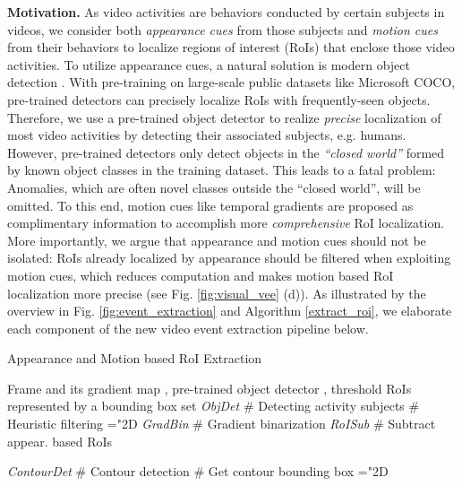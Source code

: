 \documentclass[sigconf]{acmart}
\begin{document}
\textbf{Motivation.} As video activities are behaviors conducted by certain subjects in videos, we consider both \textit{appearance cues} from those subjects and \textit{motion cues} from their behaviors to localize regions of interest (RoIs) that enclose those video activities. To utilize appearance cues, a natural solution is modern object detection \cite{cai2018cascade}. With pre-training on large-scale public datasets like Microsoft COCO, pre-trained detectors can precisely localize RoIs with frequently-seen objects. Therefore, we use a pre-trained object detector to realize \textit{precise} localization of most video activities by detecting their associated subjects, e.g. humans. However, pre-trained detectors only detect objects in the \textit{``closed world''} formed by known object classes in the training dataset. This leads to a fatal problem: Anomalies, which are often novel classes outside the ``closed world'', will be omitted. To this end, motion cues like temporal gradients are proposed as complimentary information to accomplish more \textit{comprehensive} RoI localization. More importantly, we argue that appearance and motion cues should not be isolated: RoIs already localized by appearance should be filtered when exploiting motion cues, which reduces computation and makes motion based RoI localization more precise (see Fig. \ref{fig:visual_vee} (d)). As illustrated by the overview in Fig. \ref{fig:event_extraction} and Algorithm \ref{extract_roi}, we elaborate each component of the new video event extraction pipeline below.

\begin{algorithm}[t]
	\caption{Appearance and Motion based RoI Extraction}
	\label{extract_roi}
	\begin{algorithmic}[1] \REQUIRE Frame  and its gradient map , pre-trained object detector , threshold 
		\ENSURE RoIs represented by a bounding box set 
		\STATE  \textit{ObjDet} \quad \# Detecting activity subjects
		\STATE  \quad \# Heuristic filtering
		\FOR {}
		\mathchardef\mhyphen="2D
		\IF { \AND }
		\STATE 
		\ENDIF
		\ENDFOR
		\STATE  \textit{GradBin} \quad \# Gradient binarization
		\STATE  \textit{RoISub} \quad \# Subtract appear. based RoIs
		
		\STATE  \textit{ContourDet} \quad \# Contour detection
		\STATE 
		\FOR {}
		\STATE  \quad \# Get contour bounding box
		\mathchardef\mhyphen="2D
		\IF { \AND }
		\STATE 
		\ENDIF
		\ENDFOR
\STATE 
	\end{algorithmic}
\end{algorithm}
\end{document}
